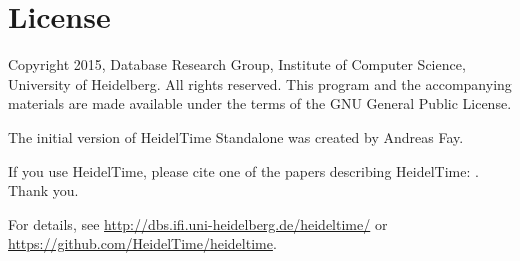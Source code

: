 \documentclass[
     11pt,         %
     a4paper,      %
     oneside,
     ]{article}
\newcommand{\product}{HeidelTime Standalone}
\begin{document}
\section{License}
Copyright \textcopyright{} 2015, Database Research Group, Institute of Computer Science, University of Heidelberg. 
All rights reserved. This program and the accompanying materials are made available under the terms of the GNU General Public License.

The initial version of \product{} was created by Andreas Fay.

If you use HeidelTime, please cite one of the papers describing HeidelTime: \cite{StroetgenGertz2010_SemEval, StroetgenGertz2013_LRE}. Thank you.

For details, see \url{http://dbs.ifi.uni-heidelberg.de/heideltime/} or \\
\url{https://github.com/HeidelTime/heideltime}.



\newpage



\newpage

\end{document}
